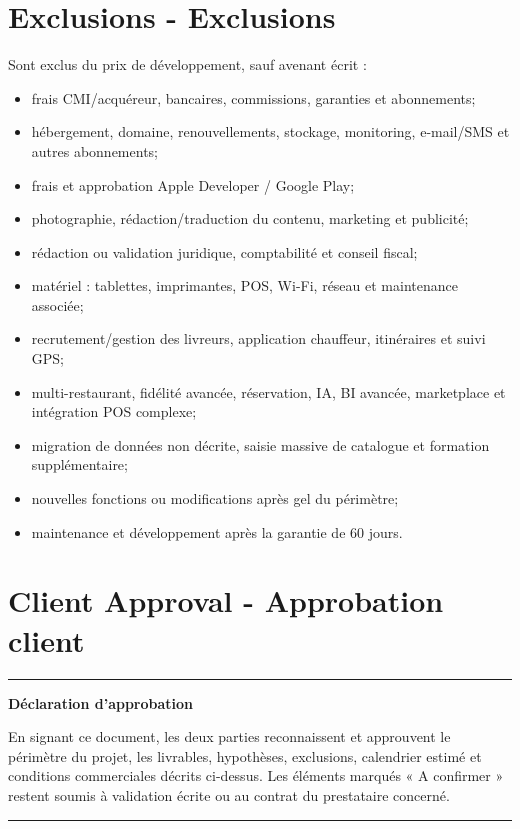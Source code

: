 \documentclass[10pt,a4paper]{article}
\newenvironment{callout}[1]{\par\medskip\noindent\begin{minipage}{\linewidth}\color{navy}\hrule\smallskip\textbf{#1}\par\smallskip\color{black}}{\smallskip\color{navy}\hrule\end{minipage}\par\medskip}
\begin{document}
\section{Exclusions - Exclusions}
Sont exclus du prix de développement, sauf avenant écrit :
\begin{itemize}
  \item frais CMI/acquéreur, bancaires, commissions, garanties et abonnements;
  \item hébergement, domaine, renouvellements, stockage, monitoring, e-mail/SMS et autres abonnements;
  \item frais et approbation Apple Developer / Google Play;
  \item photographie, rédaction/traduction du contenu, marketing et publicité;
  \item rédaction ou validation juridique, comptabilité et conseil fiscal;
  \item matériel : tablettes, imprimantes, POS, Wi-Fi, réseau et maintenance associée;
  \item recrutement/gestion des livreurs, application chauffeur, itinéraires et suivi GPS;
  \item multi-restaurant, fidélité avancée, réservation, IA, BI avancée, marketplace et intégration POS complexe;
  \item migration de données non décrite, saisie massive de catalogue et formation supplémentaire;
  \item nouvelles fonctions ou modifications après gel du périmètre;
  \item maintenance et développement après la garantie de 60 jours.
\end{itemize}

\section{Client Approval - Approbation client}
\begin{callout}{Déclaration d'approbation}
En signant ce document, les deux parties reconnaissent et approuvent le périmètre du projet, les livrables, hypothèses, exclusions, calendrier estimé et conditions commerciales décrits ci-dessus. Les éléments marqués « A confirmer » restent soumis à validation écrite ou au contrat du prestataire concerné.
\end{callout}
\end{document}
